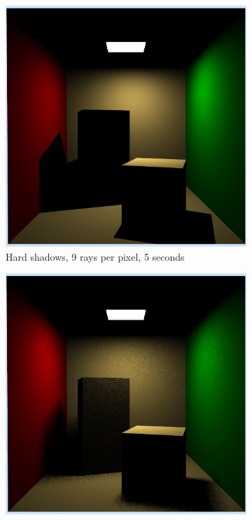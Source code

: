  \begin{figure}[h]
	\centering
	\begin{subfigure}[b]{0.4\textwidth}
		\includegraphics[width=\textwidth]{week4/cornellblocks_hardshadows_9rpp_5s.png}
		\caption{Hard shadows, 9 rays per pixel, 5 seconds}
		\label{fig:cornellblockshardshadows}
	\end{subfigure}
	\begin{subfigure}[b]{0.4\textwidth}
		\includegraphics[width=\textwidth]{week4/arealight_9rpp_5s.png}

\end{subfigure}
\end{figure}
